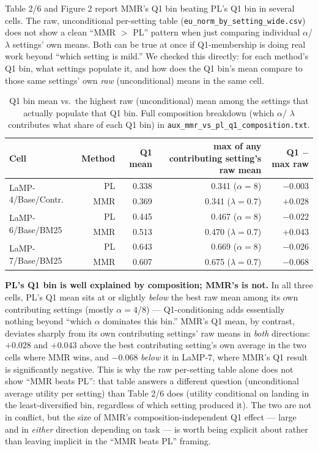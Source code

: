 \documentclass[10pt]{article}
\begin{document}
Table 2/6 and Figure 2 report MMR's Q1 bin beating PL's Q1 bin in several cells. The
raw, unconditional per-setting table (\texttt{eu\_norm\_by\_setting\_wide.csv}) does
not show a clean ``MMR $>$ PL'' pattern when just comparing individual $\alpha$/
$\lambda$ settings' own means. Both can be true at once if Q1-membership is doing
real work beyond ``which setting is mild.'' We checked this directly: for each
method's Q1 bin, what settings populate it, and how does the Q1 bin's mean compare
to those same settings' own \emph{raw} (unconditional) means in the same cell.

\begin{table}[h]
\centering
\small
\begin{tabular}{@{}lrrrr@{}}
\toprule
Cell & Method & Q1 mean & max of any contributing setting's raw mean & Q1 $-$ max raw \\
\midrule
\multirow{2}{*}{LaMP-4/Base/Contr.} & PL  & 0.338 & 0.341 ($\alpha{=}8$) & $-0.003$ \\
 & MMR & 0.369 & 0.341 ($\lambda{=}0.7$) & $+0.028$ \\
\multirow{2}{*}{LaMP-6/Base/BM25} & PL  & 0.445 & 0.467 ($\alpha{=}8$) & $-0.022$ \\
 & MMR & 0.513 & 0.470 ($\lambda{=}0.7$) & $+0.043$ \\
\multirow{2}{*}{LaMP-7/Base/BM25} & PL  & 0.643 & 0.669 ($\alpha{=}8$) & $-0.026$ \\
 & MMR & 0.607 & 0.675 ($\lambda{=}0.7$) & $-0.068$ \\
\bottomrule
\end{tabular}
\caption{Q1 bin mean vs.\ the highest raw (unconditional) mean among the settings
that actually populate that Q1 bin. Full composition breakdown (which $\alpha$/
$\lambda$ contributes what share of each Q1 bin) in
\texttt{aux\_mmr\_vs\_pl\_q1\_composition.txt}.}
\label{tab:q1-composition}
\end{table}

\textbf{PL's Q1 bin is well explained by composition; MMR's is not.} In all three
cells, PL's Q1 mean sits at or slightly \emph{below} the best raw mean among its own
contributing settings (mostly $\alpha{=}4$/$8$) --- Q1-conditioning adds essentially
nothing beyond ``which $\alpha$ dominates this bin.'' MMR's Q1 mean, by contrast,
deviates sharply from its own contributing settings' raw means in \emph{both}
directions: $+0.028$ and $+0.043$ above the best contributing setting's own average
in the two cells where MMR wins, and $-0.068$ \emph{below} it in LaMP-7, where MMR's
Q1 result is significantly negative. This is why the raw per-setting table alone
does not show ``MMR beats PL'': that table answers a different question
(unconditional average utility per setting) than Table 2/6 does (utility conditional
on landing in the least-diversified bin, regardless of which setting produced it).
The two are not in conflict, but the size of MMR's composition-independent
Q1 effect --- large and in \emph{either} direction depending on task --- is worth
being explicit about rather than leaving implicit in the ``MMR beats PL'' framing.
\end{document}

